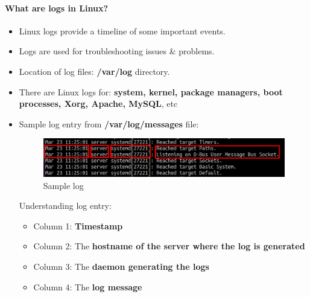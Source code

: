 \setlength{\columnsep}{3pt}
\begin{flushleft}

\bigskip

\paragraph{What are logs in Linux?}
\begin{itemize}
	\item Linux logs provide a timeline of some important events.
	\item Logs are used for troubleshooting issues \& problems. 
	\item Location of log files: \textbf{/var/log} directory. 
	\item There are Linux logs for: \textbf{system, kernel, package managers, boot processes, Xorg, Apache, MySQL}, etc
	\item Sample log entry from \textbf{/var/log/messages} file:
	
	\begin{figure}[h!]
		\centering
		\includegraphics[scale=0.35]{content/chapter16/images/logs_entry.png}
		\caption{Sample log}
		\label{fig:log}
	\end{figure}
	Understanding log entry:
	\begin{itemize}
		\item Column 1: \textbf{Timestamp}
		\item Column 2: The \textbf{hostname of the server where the log is generated}
		\item Column 3: The \textbf{daemon generating the logs}
		\item Column 4: The \textbf{log message}
	\end{itemize}
	
\end{itemize}

\end{flushleft}
\newpage


